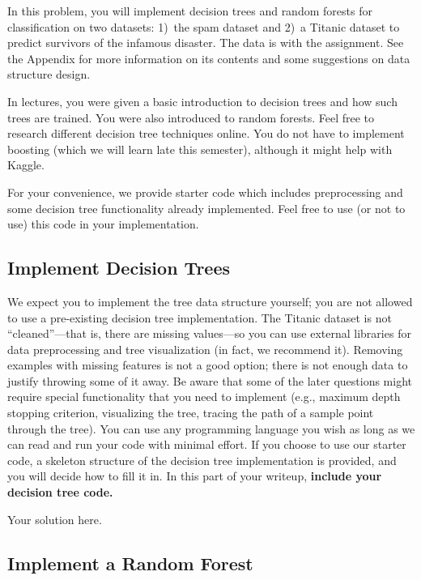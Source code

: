 
In this problem, you will implement decision trees and random forests for classification on two datasets: 1)~the spam dataset and 2)~a Titanic dataset to predict survivors of the infamous disaster. The data is with the assignment. See the Appendix for more information on its contents and some suggestions on data structure design.

In lectures, you were given a basic introduction to decision trees and how such trees are trained. You were also introduced to random forests. Feel free to research different decision tree techniques online. You do not have to implement boosting (which we will learn late this semester), although it might help with Kaggle.

For your convenience, we provide starter code which includes preprocessing and some decision tree functionality already implemented. Feel free to use (or not to use) this code in your implementation. 

\subsection{\bf  Implement Decision Trees}

We expect you to implement the tree data structure yourself; you are not allowed to use a pre-existing decision tree implementation. The Titanic dataset is not ``cleaned''---that is, there are missing values---so you can use external libraries for data preprocessing and tree visualization (in fact, we recommend it). Removing examples with missing features is not a good option; there is not enough data to justify throwing some of it away. Be aware that some of the later questions might require special functionality that you need to implement (e.g., maximum depth stopping criterion, visualizing the tree, tracing the path of a sample point through the tree). You can use any programming language you wish as long as we can read and run your code with minimal effort. If you choose to use our starter code, a skeleton structure of the decision tree implementation is provided, and you will decide how to fill it in.  In this part of your writeup, \textbf{include your decision tree code.}

\begin{solution}
Your solution here.
\end{solution}

\subsection{\bf  Implement a Random Forest}

